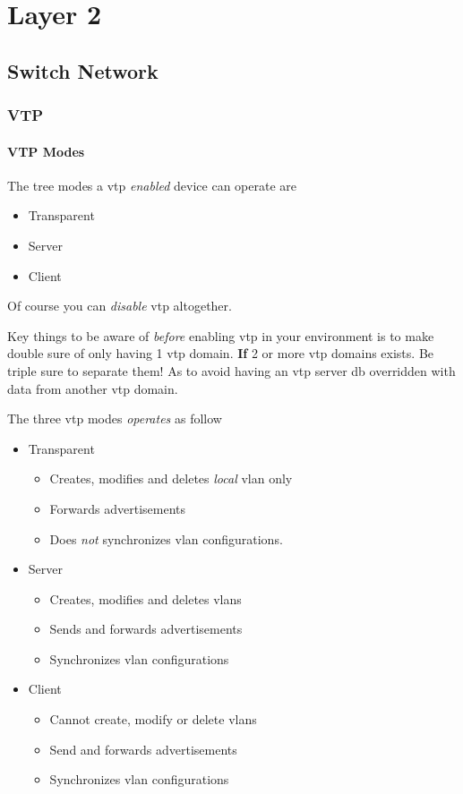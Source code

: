 \chapter{Layer 2}

\section{Switch Network}

\subsection{VTP}

\subsubsection{VTP Modes}
The tree modes a \gls{vtp} \textit{enabled} device can operate are
\begin{itemize}
    \item Transparent
    \item Server
    \item Client
\end{itemize}
Of course you can \textit{disable} \gls{vtp} altogether.

Key things to be aware of \textit{before} enabling \gls{vtp} in your environment is to make double sure of only having 1 \gls{vtp} domain. \textbf{If} 2 or more \gls{vtp} domains exists. Be triple sure to separate them! As to avoid having an \gls{vtp} server \gls{db} overridden with data from another \gls{vtp} domain.

The three \gls{vtp} modes \textit{operates} as follow

\begin{itemize}
    \item Transparent
    \begin{itemize}
        \item Creates, modifies and deletes \textit{local} \gls{vlan} only
        \item Forwards advertisements
        \item Does \textit{not} synchronizes vlan configurations.
    \end{itemize}
    \item Server
    \begin{itemize}
        \item Creates, modifies and deletes vlans
        \item Sends and forwards advertisements
        \item Synchronizes vlan configurations
    \end{itemize}
    \item Client
    \begin{itemize}
        \item Cannot create, modify or delete vlans
        \item Send and forwards advertisements
        \item Synchronizes vlan configurations
    \end{itemize}
\end{itemize}

